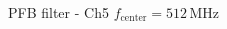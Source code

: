 \documentclass[ignorenonframetext,12pt]{beamer}
\begin{document}
\begin{frame}{PFB filter - Ch5 $f_\text{center}= 512\,\text{MHz}$}
\begin{columns}
\begin{column}{0.5\textwidth}
\begin{center}
				\end{center}
								\end{column}
								\begin{column}{0.5\textwidth}
				\begin{center}
				\end{center}
								\end{column}
				\end{columns}
				\begin{center}

\end{center}
\end{frame}
\end{document}
